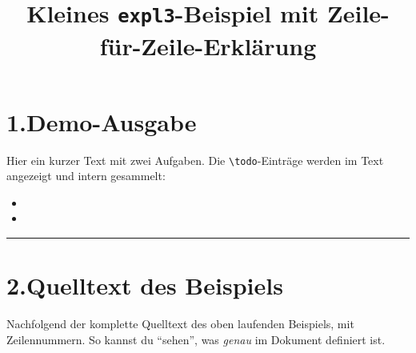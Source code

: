 \documentclass[a4paper,11pt]{article}
\title{Kleines \texttt{expl3}-Beispiel mit Zeile-für-Zeile-Erklärung}
\author{}
\date{}
\begin{document}
\maketitle

\section*{1.\;Demo-Ausgabe}
Hier ein kurzer Text mit zwei Aufgaben. Die \verb|\todo|-Einträge werden im Text angezeigt und intern gesammelt:
\begin{itemize}
  \item {}
  \item {}
\end{itemize}

\printtodos %

\cleartodos %

\printtodos %

\bigskip
\noindent\rule{\linewidth}{0.4pt}

\section*{2.\;Quelltext des Beispiels}
Nachfolgend der komplette Quelltext des oben laufenden Beispiels, mit Zeilennummern. So kannst du \enquote{sehen}, was \emph{genau} im Dokument definiert ist.
\medskip
\end{document}
